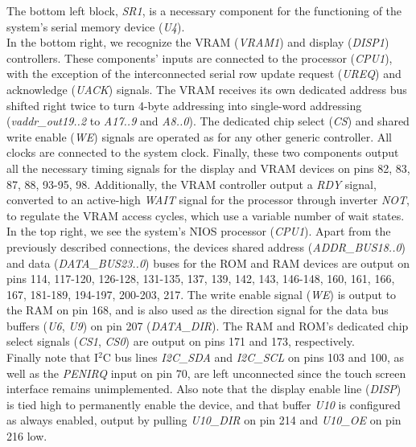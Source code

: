 \documentclass[titlepage]{scrartcl}
\begin{document}
	The bottom left block, \textit{SR1}, is a necessary component for the functioning of the system's serial memory device (\textit{U4}).\\

	In the bottom right, we recognize the VRAM (\textit{VRAM1}) and display (\textit{DISP1}) controllers. These components' inputs are connected to the processor (\textit{CPU1}), with the exception of the interconnected serial row update request (\textit{UREQ}) and acknowledge (\textit{UACK}) signals. The VRAM receives its own dedicated address bus shifted right twice to turn 4-byte addressing into single-word addressing (\textit{vaddr\_out19..2} to \textit{A17..9} and \textit{A8..0}). The dedicated chip select (\textit{CS}) and shared write enable (\textit{WE}) signals are operated as for any other generic controller. All clocks are connected to the system clock. Finally, these two components output all the necessary timing signals for the display and VRAM devices on pins 82, 83, 87, 88, 93-95, 98. Additionally, the VRAM controller output a \textit{RDY} signal, converted to an active-high \textit{WAIT} signal for the processor through inverter \textit{NOT}, to regulate the VRAM access cycles, which use a variable number of wait states.\\

	In the top right, we see the system's NIOS processor (\textit{CPU1}). Apart from the previously described connections, the devices shared address (\textit{ADDR\_BUS18..0}) and data (\textit{DATA\_BUS23..0}) buses for the ROM and RAM devices are output on pins 114, 117-120, 126-128, 131-135, 137, 139, 142, 143, 146-148, 160, 161, 166, 167, 181-189, 194-197, 200-203, 217. The write enable signal (\textit{WE}) is output to the RAM on pin 168, and is also used as the direction signal for the data bus buffers (\textit{U6}, \textit{U9}) on pin 207 (\textit{DATA\_DIR}). The RAM and ROM's dedicated chip select signals (\textit{CS1}, \textit{CS0}) are output on pins 171 and 173, respectively.\\

	Finally note that I$^2$C bus lines \textit{I2C\_SDA} and \textit{I2C\_SCL} on pins 103 and 100, as well as the \textit{PENIRQ} input on pin 70, are left unconnected since the touch screen interface remains unimplemented.  Also note that the display enable line (\textit{DISP}) is tied high to permanently enable the device, and that buffer \textit{U10} is configured as always enabled, output by pulling \textit{U10\_DIR} on pin 214 and \textit{U10\_OE} on pin 216 low.\\
\end{document}
